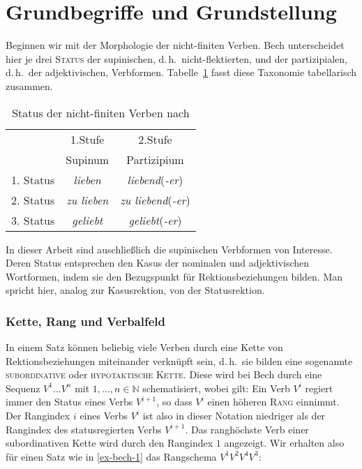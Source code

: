 \section{Grundbegriffe und Grundstellung} \label{sec-kohaerenz-einf}

Beginnen wir mit der Morphologie der nicht-finiten Verben. Bech unterscheidet hier je drei \textsc{Status} der supinischen, d.\,h.\ nicht-flektierten, und der partizipialen, d.\,h.\ der adjektivischen, Verb\-for\-men. Tabelle~\ref{fig-status} fasst diese Taxonomie tabellarisch zusammen.   
\begin{table}[t]
\begin{center}

\begin{tabular}{ccc}
\toprule
& 1.Stufe	& 2.Stufe 	\\
& Supinum	& Partizipium	\\
\midrule
1. Status	& \emph{lieben}	& \emph{liebend}(\emph{-er})\\
2. Status	& \emph{zu lieben} & \emph{zu liebend}(\emph{-er})\\
3. Status	& \emph{geliebt}& \emph{geliebt}(\emph{-er})\\
\bottomrule
\end{tabular}

\end{center}
\caption{Status der nicht-finiten Verben nach \cite{Bech:55} \label{fig-status}}
\end{table}
In dieser Arbeit sind auschlie\ss lich die supinischen Verb\-formen von Interesse. Deren Status entsprechen den Kasus der nominalen und adjektivischen Wortformen, indem sie den Bezugspunkt für Rektionsbeziehungen bilden. Man spricht hier, analog zur Kasusrektion, von der Statusrektion. 

\subsubsection*{Kette, Rang und Verbalfeld}

In einem Satz können beliebig viele Verben durch eine Kette von Rektionsbeziehungen miteinander verknüpft sein, d.\,h.\ sie bilden eine sogenannte \textsc{subordinative} oder \textsc{hypotaktische Kette}. Diese wird bei Bech durch eine Sequenz $V^{1} \ldots V^{n}$ mit $1, \ldots , n \in \mathbb{N}$ schematisiert, wobei gilt: Ein Verb $V^i$ regiert immer den Status eines Verbs $V^{i+1}$, so dass $V^i$ einen höheren \textsc{Rang} einnimmt. Der Rangindex $i$ eines Verbs $V^i$ ist also in dieser Notation niedriger als der Rangindex des statusregierten Verbs $V^{i+1}$. Das ranghöchste Verb einer subordinativen Kette wird durch den Rangindex $1$ angezeigt. Wir erhalten also für einen Satz wie in \ref{ex-bech-1} das Rangschema $V^1 V^2 V^4 V^3$:

